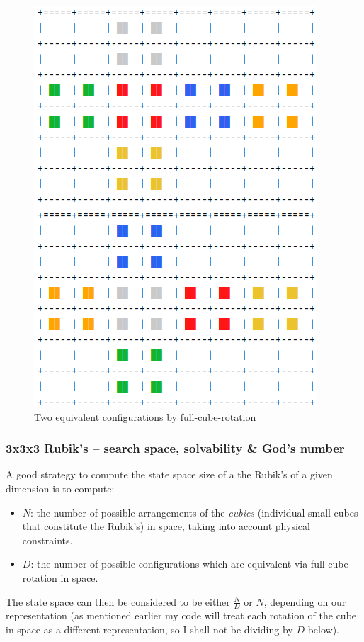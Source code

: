 \begin{figure}[H]
\centering
\includegraphics[scale=0.4]{./Figures/equivalentcubes}
\caption[Reducing RC]{Two equivalent configurations by full-cube-rotation}
\label{fig:configurations}
\end{figure}



\subsubsection{3x3x3 Rubik's -- search space, solvability \& God's number}

A good strategy to compute the state space size of a the Rubik's of a given dimension is to compute:
\begin{itemize}
\item $N$: the number of possible arrangements of the \textit{cubies} (individual small cubes that constitute the Rubik's) in space, taking into account physical constraints.
\item $D$: the number of possible configurations which are equivalent via full cube rotation in space.
\end{itemize}
The state space can then be considered to be either $\frac{N}{D}$ or $N$, depending on our representation (as mentioned earlier my code will treat each rotation of the cube in space as a different representation, so I shall not be dividing by $D$ below).

